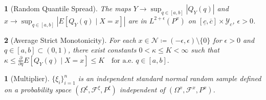 \documentclass[12pt]{article}
\newtheorem{assumpL}{}
\newtheorem{assumpM}{}
\begin{document}
\begin{assumpL}[Random Quantile Spread] \label{asspt:quantile_spread}
The maps $Y \to \sup_{q \in [a,b]} |Q_Y(q)|$ and  \\
$x \to \sup_{q \in [a,b]} \left| E[Q_Y(q) \mid X=x] \right| $ are in $L^{2+\epsilon}(P^x)$ on $[\underline{c}, \overline{c}] \times \mathcal{Y}_c$, $\epsilon >0$.
\end{assumpL}

\begin{assumpL}[Average Strict Monotonicity] \label{asspt:strictness}
For each $x\in \mathcal{N} \coloneqq (-\epsilon, \epsilon) \setminus \{0\}$ for $\epsilon > 0$ and $q\in [a,b] \subset (0,1)$, there exist constants $0<\kappa\le K<\infty$ such that
$
\kappa \le \frac{\partial}{\partial q} E[Q_Y(q) \mid X=x]  \le  K \quad \text{for a.e. } q\in[a,b].
$
\end{assumpL}

\begin{assumpM}[Multiplier] \label{asspt:multiplier} $\{ \xi_i \}_{i=1}^n$ is an independent standard normal random sample defined on a probability space $(\Omega^\xi, \mathcal{F}^\xi, P^\xi)$ independent of $(\Omega^x, \mathcal{F}^x, P^x)$.
\end{assumpM}
\end{document}
